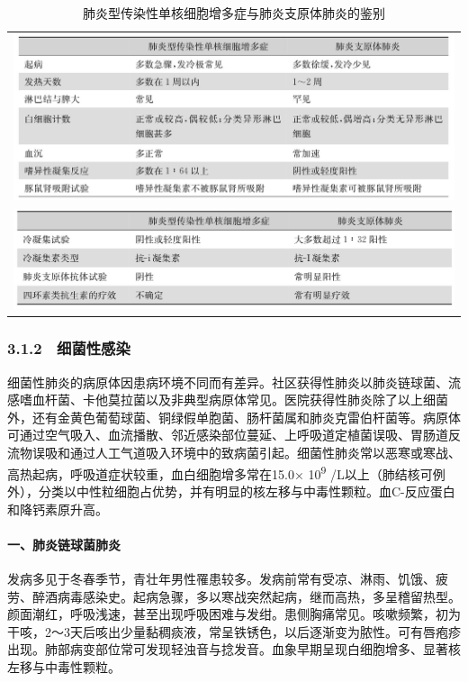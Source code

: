 \begin{longtable}{c}
  \caption{肺炎型传染性单核细胞增多症与肺炎支原体肺炎的鉴别}
  \label{tab2-9}
  \endfirsthead
  \caption[]{肺炎型传染性单核细胞增多症与肺炎支原体肺炎的鉴别}
  \endhead
  \includegraphics[width=\textwidth,height=\textheight,keepaspectratio]{./images/Image00013.jpg} \\
  \includegraphics[width=\textwidth,height=\textheight,keepaspectratio]{./images/Image00014.jpg} \\
\end{longtable}

\subsubsection{3.1.2　细菌性感染}

细菌性肺炎的病原体因患病环境不同而有差异。社区获得性肺炎以肺炎链球菌、流感嗜血杆菌、卡他莫拉菌以及非典型病原体常见。医院获得性肺炎除了以上细菌外，还有金黄色葡萄球菌、铜绿假单胞菌、肠杆菌属和肺炎克雷伯杆菌等。病原体可通过空气吸入、血流播散、邻近感染部位蔓延、上呼吸道定植菌误吸、胃肠道反流物误吸和通过人工气道吸入环境中的致病菌引起。细菌性肺炎常以恶寒或寒战、高热起病，呼吸道症状较重，血白细胞增多常在15.0×
10\textsuperscript{9}
/L以上（肺结核可例外），分类以中性粒细胞占优势，并有明显的核左移与中毒性颗粒。血C-反应蛋白和降钙素原升高。

\paragraph{一、肺炎链球菌肺炎}

发病多见于冬春季节，青壮年男性罹患较多。发病前常有受凉、淋雨、饥饿、疲劳、醉酒病毒感染史。起病急骤，多以寒战突然起病，继而高热，多呈稽留热型。颜面潮红，呼吸浅速，甚至出现呼吸困难与发绀。患侧胸痛常见。咳嗽频繁，初为干咳，2～3天后咳出少量黏稠痰液，常呈铁锈色，以后逐渐变为脓性。可有唇疱疹出现。肺部病变部位常可发现轻浊音与捻发音。血象早期呈现白细胞增多、显著核左移与中毒性颗粒。

